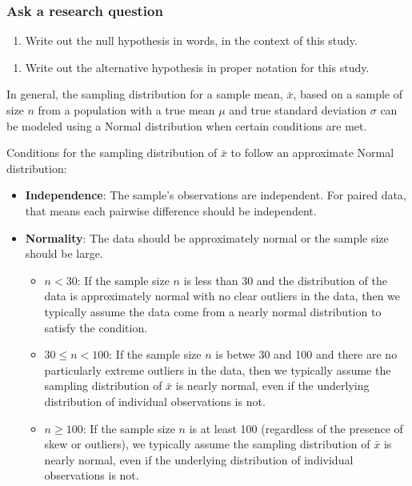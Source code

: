 \documentclass[
]{report}
\providecommand{\tightlist}{%
  \setlength{\itemsep}{0pt}\setlength{\parskip}{0pt}}
\begin{document}
\subsubsection*{Ask a research question}\label{ask-a-research-question-1}

\begin{enumerate}
\def\labelenumi{\arabic{enumi}.}
\setcounter{enumi}{2}
\tightlist
\item
  Write out the null hypothesis in words, in the context of this study.
\end{enumerate}

\vspace{0.8in}

\begin{enumerate}
\def\labelenumi{\arabic{enumi}.}
\setcounter{enumi}{3}
\tightlist
\item
  Write out the alternative hypothesis in proper notation for this study.
\end{enumerate}

\vspace{0.5in}

In general, the sampling distribution for a sample mean, \(\bar{x}\), based on a sample of size \(n\) from a population with a true mean \(\mu\) and true standard deviation \(\sigma\) can be modeled using a Normal distribution when certain conditions are met.

Conditions for the sampling distribution of \(\bar{x}\) to follow an approximate Normal distribution:

\begin{itemize}
\item
  \textbf{Independence}: The sample's observations are independent. For paired data, that means each pairwise difference should be independent.
\item
  \textbf{Normality}: The data should be approximately normal or the sample size should be large.

  \begin{itemize}
  \item
    \(n < 30\): If the sample size \(n\) is less than 30 and the distribution of the data is approximately normal with no clear outliers in the data, then we typically assume the data come from a nearly normal distribution to satisfy the condition.
  \item
    \(30 \leq n < 100\): If the sample size \(n\) is betwe 30 and 100 and there are no particularly extreme outliers in the data, then we typically assume the sampling distribution of \(\bar{x}\) is nearly normal, even if the underlying distribution of individual observations is not.
  \item
    \(n \geq 100\): If the sample size \(n\) is at least 100 (regardless of the presence of skew or outliers), we typically assume the sampling distribution of \(\bar{x}\) is nearly normal, even if the underlying distribution of individual observations is not.
  \end{itemize}
\end{itemize}
\end{document}
